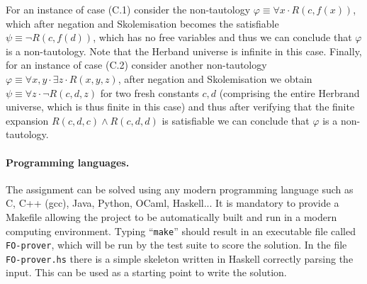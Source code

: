 \documentclass[zad,zawodnik,en]{sinol}
\begin{document}
    For an instance of case (C.1) consider the non-tautology
    $\varphi \equiv \forall x \cdot R(c, f(x))$,
    which after negation and Skolemisation becomes the satisfiable $\psi \equiv \neg R(c, f(d))$,
    which has no free variables and thus we can conclude that $\varphi$ is a non-tautology.
    Note that the Herband universe is infinite in this case.
    Finally, for an instance of case (C.2) consider another non-tautology
    $\varphi \equiv \forall x, y \cdot \exists z \cdot R(x, y, z)$,
    after negation and Skolemisation we obtain
    $\psi \equiv \forall z \cdot \neg R(c, d, z)$
    for two fresh constants $c, d$
    (comprising the entire Herbrand universe, which is thus finite in this case)
    and thus after verifying that the finite expansion $R(c, d, c) \land R(c, d, d)$ is satisfiable we can conclude that $\varphi$ is a non-tautology.
    
    \paragraph{Programming languages.}
    The assignment can be solved using any modern programming language
    such as C, C++ (gcc), Java, Python, OCaml, Haskell...
    It is mandatory to provide a Makefile
    allowing the project to be automatically built and run
    in a modern computing environment.
    Typing ``\texttt{make}'' should result in an executable file
    called \texttt{FO-prover},
    which will be run by the test suite to score the solution.
    In the file \texttt{FO-prover.hs}
    there is a simple skeleton written in Haskell
    correctly parsing the input.
    This can be used as a starting point to write the solution.
    
\end{document}
